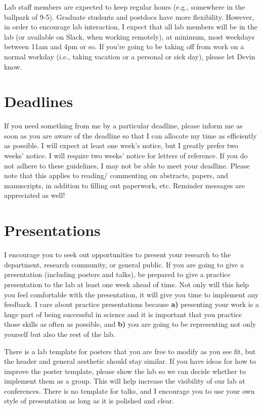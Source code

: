 \documentclass[
]{book}
\begin{document}
Lab staff members are expected to keep regular hours (e.g., somewhere in the ballpark of 9-5). Graduate students and postdocs have more flexibility. However, in order to encourage lab interaction, I expect that all lab members will be in the lab (or available on Slack, when working remotely), at minimum, most weekdays between 11am and 4pm or so. If you're going to be taking off from work on a normal workday (i.e., taking vacation or a personal or sick day), please let Devin know.

\hypertarget{deadlines}{%
\section{Deadlines}\label{deadlines}}

If you need something from me by a particular deadline, please inform me as soon as you are aware of the deadline so that I can allocate my time as efficiently as possible. I will expect at least one week's notice, but I greatly prefer two weeks' notice. I will require two weeks' notice for letters of reference. If you do not adhere to these guidelines, I may not be able to meet your deadline. Please note that this applies to reading/ commenting on abstracts, papers, and manuscripts, in addition to filling out paperwork, etc. Reminder messages are appreciated as well!

\hypertarget{presentations}{%
\section{Presentations}\label{presentations}}

I encourage you to seek out opportunities to present your research to the department, research community, or general public. If you are going to give a presentation (including posters and talks), be prepared to give a practice presentation to the lab at least one week ahead of time. Not only will this help you feel comfortable with the presentation, it will give you time to implement any feedback. I care about practice presentations because \textbf{a)} presenting your work is a huge part of being successful in science and it is important that you practice those skills as often as possible, and \textbf{b)} you are going to be representing not only yourself but also the rest of the lab.

There is a lab template for posters that you are free to modify as you see fit, but the header and general aesthetic should stay similar. If you have ideas for how to improve the poster template, please show the lab so we can decide whether to implement them as a group. This will help increase the visibility of our lab at conferences. There is no template for talks, and I encourage you to use your own style of presentation as long as it is polished and clear.
\end{document}
